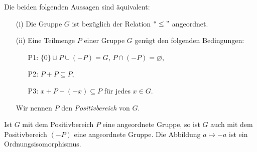 %
\begin{folg}\label{angeordnetFolgtPositivbereich} %
%
Die beiden folgenden Aussagen sind äquivalent:
\begin{enumerate}
\item[(i)] Die Gruppe $G$ ist bezüglich der Relation $``\leq "$ angeordnet.
\item[(ii)] Eine Teilmenge $P$ einer Gruppe $G$ genügt den folgenden Bedingungen:
\begin{enumerate}
\item[P1:] $\lbrace0\rbrace \cup P\cup \left(-P\right) = G$, $P \cap \left(-P\right) = \varnothing$,
\item[P2:] $P + P \subseteq P$,
\item[P3:] $x+P+(-x) \subseteq P$ für jedes $x \in G$.
\end{enumerate}
Wir nennen $P$ den \textit{Positivbereich} von $G$.
\end{enumerate}

%
\end{folg}
%
%
%
\begin{bsp}
Ist $G$ mit dem Positivbereich $P$ eine angeordnete Gruppe, so ist $G$ auch mit dem Positivbereich $(-P)$ eine angeordnete Gruppe. Die Abbildung $a \mapsto -a$ ist ein Ordnungsisomorphismus.
\end{bsp}
%

